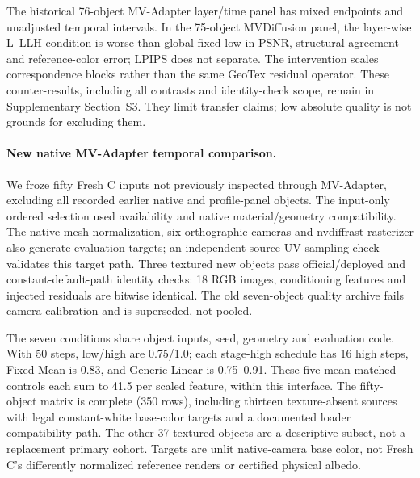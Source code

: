 \documentclass[times,twocolumn,final]{elsarticle}
\begin{document}
The historical 76-object MV-Adapter layer/time panel has mixed endpoints and unadjusted temporal intervals. In the 75-object MVDiffusion panel, the layer-wise L--LLH condition is worse than global fixed low in PSNR, structural agreement and reference-color error; LPIPS does not separate. The intervention scales correspondence blocks rather than the same GeoTex residual operator. These counter-results, including all contrasts and identity-check scope, remain in Supplementary Section~S3. They limit transfer claims; low absolute quality is not grounds for excluding them.

\paragraph{New native MV-Adapter temporal comparison.}
\label{subsec:new-mva}
We froze fifty Fresh C inputs not previously inspected through MV-Adapter, excluding all recorded earlier native and profile-panel objects. The input-only ordered selection used availability and native material/geometry compatibility. The native mesh normalization, six orthographic cameras and nvdiffrast rasterizer also generate evaluation targets; an independent source-UV sampling check validates this target path. Three textured new objects pass official/deployed and constant-default-path identity checks: 18 RGB images, conditioning features and injected residuals are bitwise identical. The old seven-object quality archive fails camera calibration and is superseded, not pooled.

The seven conditions share object inputs, seed, geometry and evaluation code. With 50 steps, low/high are 0.75/1.0; each stage-high schedule has 16 high steps, Fixed Mean is 0.83, and Generic Linear is 0.75--0.91. These five mean-matched controls each sum to 41.5 per scaled feature, within this interface. The fifty-object matrix is complete (350 rows), including thirteen texture-absent sources with legal constant-white base-color targets and a documented loader compatibility path. The other 37 textured objects are a descriptive subset, not a replacement primary cohort. Targets are unlit native-camera base color, not Fresh C's differently normalized reference renders or certified physical albedo.
\end{document}
